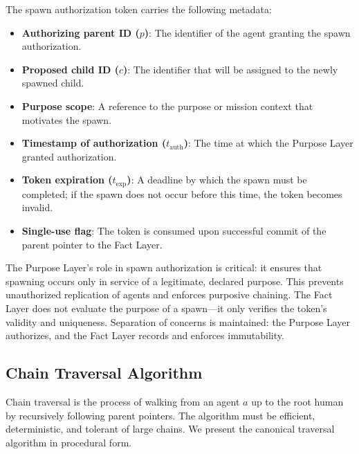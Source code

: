 The spawn authorization token carries the following metadata:

\begin{itemize}
    \item \textbf{Authorizing parent ID (\(p\))}: The identifier of the agent granting the spawn authorization.
    \item \textbf{Proposed child ID (\(c\))}: The identifier that will be assigned to the newly spawned child.
    \item \textbf{Purpose scope}: A reference to the purpose or mission context that motivates the spawn.
    \item \textbf{Timestamp of authorization (\(t_{\text{auth}}\))}: The time at which the Purpose Layer granted authorization.
    \item \textbf{Token expiration (\(t_{\text{exp}}\))}: A deadline by which the spawn must be completed; if the spawn does not occur before this time, the token becomes invalid.
    \item \textbf{Single-use flag}: The token is consumed upon successful commit of the parent pointer to the Fact Layer.
\end{itemize}

The Purpose Layer's role in spawn authorization is critical: it ensures that spawning occurs only in service of a legitimate, declared purpose. This prevents unauthorized replication of agents and enforces purposive chaining. The Fact Layer does not evaluate the purpose of a spawn---it only verifies the token's validity and uniqueness. Separation of concerns is maintained: the Purpose Layer authorizes, and the Fact Layer records and enforces immutability.

\subsection{Chain Traversal Algorithm}

Chain traversal is the process of walking from an agent \(a\) up to the root human by recursively following parent pointers. The algorithm must be efficient, deterministic, and tolerant of large chains. We present the canonical traversal algorithm in procedural form.

